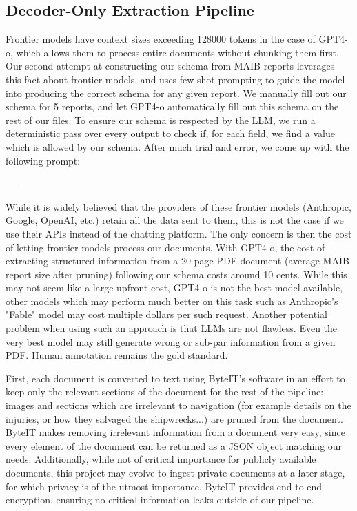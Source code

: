 \documentclass[10pt]{reportMaster}
\begin{document}
\subsection{Decoder-Only Extraction Pipeline}

Frontier models have context sizes exceeding 128000 tokens in the case of GPT4-o, which allows them to process entire documents without chunking them first. Our second attempt at constructing our schema from MAIB reports leverages this fact about frontier models, and uses few-shot prompting to guide the model into producing the correct schema for any given report. We manually fill out our schema for 5 reports, and let GPT4-o automatically fill out this schema on the rest of our files. To ensure our schema is respected by the LLM, we run a deterministic pass over every output to check if, for each field, we find a value which is allowed by our schema. After much trial and error, we come up with the following prompt: 

-----

While it is widely believed that the providers of these frontier models (Anthropic, Google, OpenAI, etc.) retain all the data sent to them, this is not the case if we use their APIs instead of the chatting platform\cite{openaiprivacy}. The only concern is then the cost of letting frontier models process our documents. With GPT4-o, the cost of extracting structured information from a 20 page PDF document (average MAIB report size after pruning) following our schema costs around 10 cents\cite{openaipricing}. While this may not seem like a large upfront cost, GPT4-o is not the best model available, other models which may perform much better on this task such as Anthropic's "Fable" model may cost multiple dollars per such request. Another potential problem when using such an approach is that LLMs are not flawless. Even the very best model may still generate wrong or sub-par information from a given PDF. Human annotation remains the gold standard. 

First, each document is converted to text using ByteIT's software\cite{byteitwebsite} in an effort to keep only the relevant sections of the document for the rest of the pipeline: images and sections which are irrelevant to navigation (for example details on the injuries, or how they salvaged the shipwrecks...) are pruned from the document. ByteIT makes removing irrelevant information from a document very easy, since every element of the document can be returned as a JSON object matching our needs. Additionally, while not of critical importance for publicly available documents, this project may evolve to ingest private documents at a later stage, for which privacy is of the utmost importance. ByteIT provides end-to-end encryption, ensuring no critical information leaks outside of our pipeline. 
\end{document}
